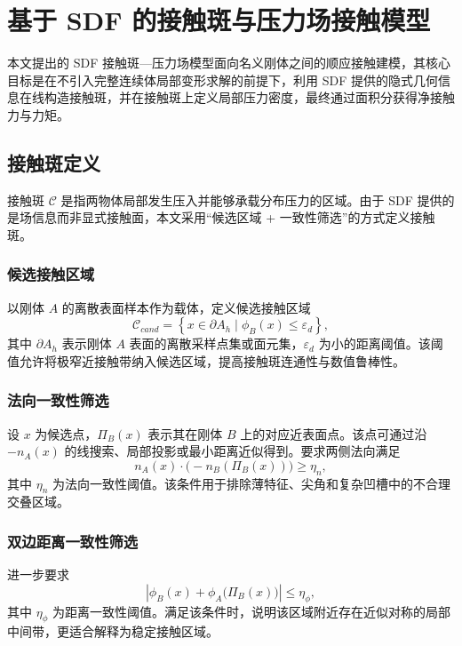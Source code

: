 \section{基于 SDF 的接触斑与压力场接触模型}
本文提出的 SDF 接触斑—压力场模型面向名义刚体之间的顺应接触建模，其核心目标是在不引入完整连续体局部变形求解的前提下，利用 SDF 提供的隐式几何信息在线构造接触斑，并在接触斑上定义局部压力密度，最终通过面积分获得净接触力与力矩。

\subsection{接触斑定义}
接触斑 $\mathcal{C}$ 是指两物体局部发生压入并能够承载分布压力的区域。由于 SDF 提供的是场信息而非显式接触面，本文采用“候选区域 + 一致性筛选”的方式定义接触斑。

\subsubsection{候选接触区域}
以刚体 $A$ 的离散表面样本作为载体，定义候选接触区域
\begin{equation}
\mathcal{C}_{cand}=\left\{x\in \partial A_h\mid \phi_B(x)\le \varepsilon_d\right\},
\end{equation}
其中 $\partial A_h$ 表示刚体 $A$ 表面的离散采样点集或面元集，$\varepsilon_d$ 为小的距离阈值。该阈值允许将极窄近接触带纳入候选区域，提高接触斑连通性与数值鲁棒性。

\subsubsection{法向一致性筛选}
设 $x$ 为候选点，$\Pi_B(x)$ 表示其在刚体 $B$ 上的对应近表面点。该点可通过沿 $-n_A(x)$ 的线搜索、局部投影或最小距离近似得到。要求两侧法向满足
\begin{equation}
n_A(x)\cdot\bigl(-n_B(\Pi_B(x))\bigr)\ge \eta_n,
\end{equation}
其中 $\eta_n$ 为法向一致性阈值。该条件用于排除薄特征、尖角和复杂凹槽中的不合理交叠区域。

\subsubsection{双边距离一致性筛选}
进一步要求
\begin{equation}
\left|\phi_B(x)+\phi_A\bigl(\Pi_B(x)\bigr)\right|\le \eta_\phi,
\end{equation}
其中 $\eta_\phi$ 为距离一致性阈值。满足该条件时，说明该区域附近存在近似对称的局部中间带，更适合解释为稳定接触区域。

